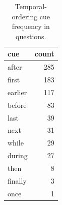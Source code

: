 \begin{table}[t]
\centering
\small
\caption{Temporal-ordering cue frequency in questions.}
\label{tab:temporal}
\begin{tabular}{lr}
\toprule
cue & count \\
\midrule
after & 285 \\
first & 183 \\
earlier & 117 \\
before & 83 \\
last & 39 \\
next & 31 \\
while & 29 \\
during & 27 \\
then & 8 \\
finally & 3 \\
once & 1 \\
\bottomrule
\end{tabular}
\end{table}
